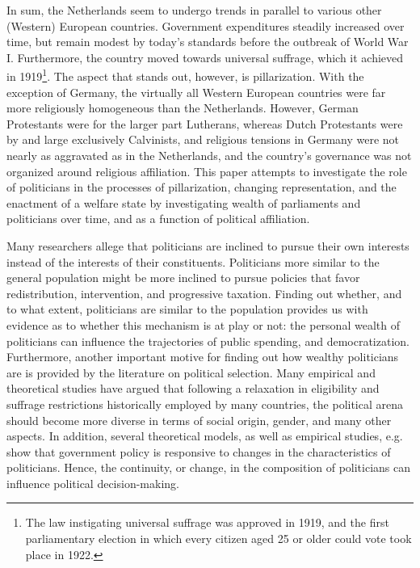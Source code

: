     In sum, the Netherlands seem to undergo trends in parallel to various other (Western) European countries. Government expenditures steadily increased over time, but remain modest by today's standards before the outbreak of World War I. Furthermore, the country moved towards universal suffrage, which it achieved in 1919\footnote{The law instigating universal suffrage was approved in 1919, and the first parliamentary election in which every citizen aged 25 or older could vote took place in 1922.}. The aspect that stands out, however, is pillarization. With the exception of Germany, the virtually all Western European countries were far more religiously homogeneous than the Netherlands. However, German Protestants were for the larger part Lutherans, whereas Dutch Protestants were by and large exclusively Calvinists, and religious tensions in Germany were not nearly as aggravated as in the Netherlands, and the country's governance was not organized around religious affiliation. This paper attempts to investigate the role of politicians in the processes of pillarization, changing representation, and the enactment of a welfare state by investigating wealth of parliaments and politicians over time, and as a function of political affiliation.

    Many researchers allege that politicians are inclined to pursue their own interests instead of the interests of their constituents. \autocite{lizzeri2004did, duggan2017political, corvalan2020political} Politicians more similar to the general population might be more inclined to pursue policies that favor redistribution, intervention, and progressive taxation. Finding out whether, and to what extent, politicians are similar to the population provides us with evidence as to whether this mechanism is at play or not: the personal wealth of politicians can influence the trajectories of public spending, and democratization. Furthermore, another important motive for finding out how wealthy politicians are is provided by the literature on political selection. Many empirical and theoretical studies have argued that following a relaxation in eligibility and suffrage restrictions historically employed by many countries, the political arena should  become more diverse in terms of social origin, gender, and many other aspects.\autocite{besley1997economic, besley2005political, bernini2018race} In addition, several theoretical models, as well as empirical studies, e.g.  show that government policy is responsive to changes in the characteristics of politicians. \autocite{meltzer1981rational, besley2011educated, chattopadhyay2004women, hayo2014political} Hence, the continuity, or change, in the composition of politicians can influence political decision-making. 

